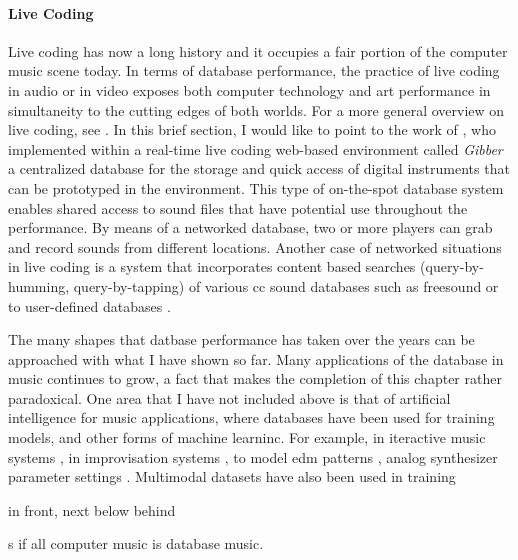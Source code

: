 {	\paragraph{Live Coding}
	Live coding has now a long history and it occupies a fair portion of the computer music scene today. In terms of database performance, the practice of live coding in audio or in video exposes both computer technology and art performance in simultaneity to the cutting edges of both worlds. For a more general overview on live coding, see \parencites{nickcollinsphd}{Col03:Liv}{Nilson2007}{Zmo15:Liv}. In this brief section, I would like to point to the work of \cite{croberts:2014}, who implemented within a real-time live coding web-based environment called \textit{Gibber} a centralized database for the storage and quick access of digital instruments that can be prototyped in the environment. This type of on-the-spot database system enables shared access to sound files that have potential use throughout the performance. By means of a networked database, two or more players can grab and record sounds from different locations. Another case of networked situations in live coding is a system that incorporates content based searches (query-by-humming, query-by-tapping) of various \gls{cc} sound databases such as \gls{freesound} or to user-defined databases \parencite{nime18-Xambo-b}.
}

The many shapes that datbase performance has taken over the years can be approached with what I have shown so far. Many applications of the database in music continues to grow, a fact that makes the completion of this chapter rather paradoxical. One area that I have not included above is that of artificial intelligence for music applications, where databases have been used for training models, and other forms of machine learninc. For example, in iteractive music systems \parencite{Row92:Int}, in improvisation systems \parencites{DBLP:conf/icmc/AssayagDD99}{DBLP:conf/icmc/BlochD08}, to model \gls{edm} patterns \parencite{rvogl:2017}, analog synthesizer parameter settings \parencite{Loviscach2008}. Multimodal datasets have also been used in training \parencite{DBLP:conf/icmc/SchonerCDG98} 



in front, next
below
behind


s if all computer music is database music.

